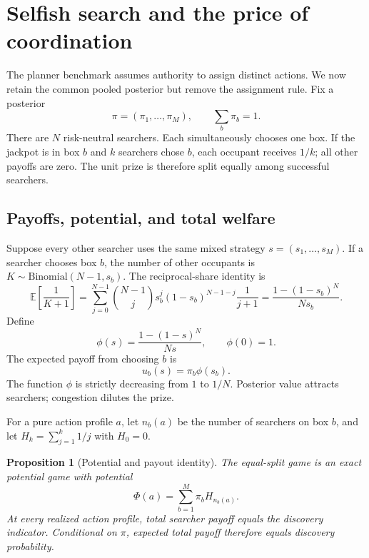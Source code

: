 \documentclass[11pt]{article}
\newtheorem{proposition}{Proposition}
\theoremstyle{definition}
\theoremstyle{remark}
\newcommand{\E}{\mathbb{E}}
\newcommand{\1}{\mathbf{1}}
\begin{document}
\section{Selfish search and the price of coordination}
\label{sec:selfish}

The planner benchmark assumes authority to assign distinct actions. We now retain the common pooled posterior but remove the assignment rule. Fix a posterior
\[
\pi=(\pi_1,\ldots,\pi_M),
\qquad \sum_b\pi_b=1.
\]
There are $N$ risk-neutral searchers. Each simultaneously chooses one box. If the jackpot is in box $b$ and $k$ searchers chose $b$, each occupant receives $1/k$; all other payoffs are zero. The unit prize is therefore split equally among successful searchers.

\subsection{Payoffs, potential, and total welfare}

Suppose every other searcher uses the same mixed strategy $s=(s_1,\ldots,s_M)$. If a searcher chooses box $b$, the number of other occupants is $K\sim\mathrm{Binomial}(N-1,s_b)$. The reciprocal-share identity is
\begin{equation}
\E\left[\frac{1}{K+1}\right]
=\sum_{j=0}^{N-1}\binom{N-1}{j}s_b^j(1-s_b)^{N-1-j}\frac{1}{j+1}
=\frac{1-(1-s_b)^N}{Ns_b}.
\label{eq:reciprocal}
\end{equation}
Define
\begin{equation}
\phi(s)=\frac{1-(1-s)^N}{Ns},
\qquad \phi(0)=1.
\label{eq:phi}
\end{equation}
The expected payoff from choosing $b$ is
\begin{equation}
u_b(s)=\pi_b\phi(s_b).
\label{eq:payoff}
\end{equation}
The function $\phi$ is strictly decreasing from $1$ to $1/N$. Posterior value attracts searchers; congestion dilutes the prize.

For a pure action profile $a$, let $n_b(a)$ be the number of searchers on box $b$, and let $H_k=\sum_{j=1}^k1/j$ with $H_0=0$.

\begin{proposition}[Potential and payout identity]
The equal-split game is an exact potential game with potential
\begin{equation}
\Phi(a)=\sum_{b=1}^M \pi_b H_{n_b(a)}.
\label{eq:harmonic-potential}
\end{equation}
At every realized action profile, total searcher payoff equals the discovery indicator. Conditional on $\pi$, expected total payoff therefore equals discovery probability.
\end{proposition}
\end{document}
